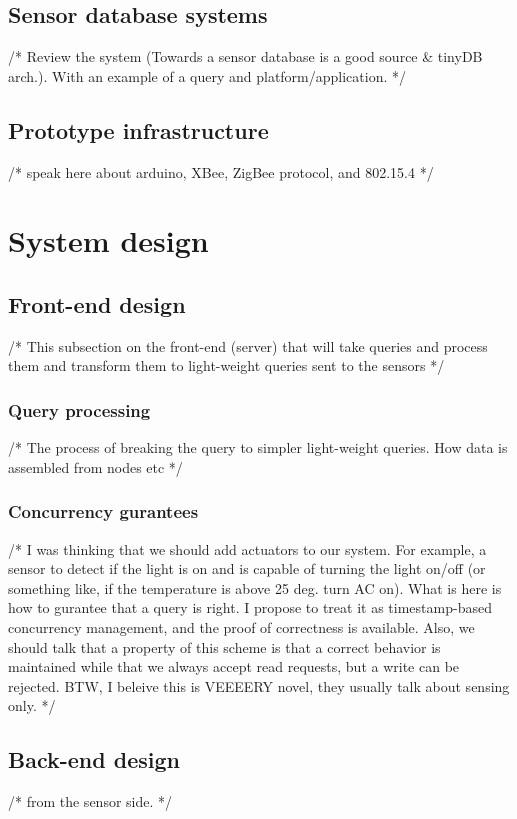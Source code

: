 \documentclass[10pt, conference]{IEEEtran}
\begin{document}
\subsection{Sensor database systems}
/* Review the system (Towards a sensor database is a good source \& tinyDB arch.). With an example of a query and platform/application. */

\subsection{Prototype infrastructure}
/* speak here about arduino, XBee, ZigBee protocol, and 802.15.4 */

\section{System design}\label{sec:design}

\subsection{Front-end design}
/* This subsection on the front-end (server) that will take queries and process them and transform them to light-weight queries sent to the sensors */

\subsubsection{Query processing}
/* The process of breaking the query to simpler light-weight queries. How data is assembled from nodes etc */

\subsubsection{Concurrency gurantees}
/* I was thinking that we should add actuators to our system. For example, a sensor to detect if the light is on and is capable of turning the light on/off (or something like, if the temperature is above 25 deg. turn AC on). What is here is how to gurantee that a query is right. I propose to treat it as timestamp-based concurrency management, and the proof of correctness is available. Also, we should talk that a property of this scheme is that a correct behavior is maintained while that we always accept read requests, but a write can be rejected.
BTW, I beleive this is VEEEERY novel, they usually talk about sensing only.
 */

\subsection{Back-end design}
/* from the sensor side. */
\end{document}
